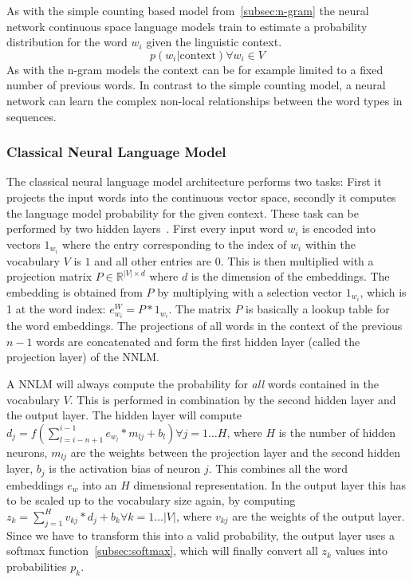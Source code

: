 As with the simple counting based model from~\ref{subsec:n-gram} the neural network continuous space language models train to
estimate a probability distribution for the word $w_i$ given the linguistic context.
\[
    p(w_i|\text{context}) \forall w_i \in V
\]
As with the n-gram models the context can be for example limited to a fixed number of previous words. In contrast to the
simple counting model, a neural network can learn the complex non-local relationships between the word types in sequences.

\subsubsection{Classical Neural Language Model}

The classical neural language model architecture performs two tasks: First it projects the input words into the continuous vector space,
secondly it computes the language model probability for the given context. These task can be performed by two 
hidden layers~\cite{Schwenk:2007:CSL:1230156.1230409}. 
First every input word $w_i$ is encoded into vectors $1_{w_i}$ where
the entry corresponding to the index of $w_i$ within the vocabulary $V$ is $1$ and all other entries are $0$. 
This is then multiplied with a projection matrix $P \in \mathbb{R}^{|V| \times d}$ where $d$ is the dimension of the embeddings.
The embedding is obtained from $P$ by multiplying with a selection vector $1_{w_i}$, 
which is 1 at the word index: $e_{w_i}^W = P * 1_{w_i}$. The matrix $P$ is basically a lookup 
table for the word embeddings. 
The projections of all words in the context of the previous $n-1$ words are concatenated and form 
the first hidden layer (called the projection layer) of the NNLM.

A NNLM will always compute the probability for \textit{all} words contained in the vocabulary $V$. 
This is performed in combination by the second hidden layer and the output layer. 
The hidden layer will compute $d_j = f(\sum_{l = i-n+1}^{i-1} e_{w_l} * m_{lj} + b_l) \forall j = 1 \dots H$, 
where $H$ is the number of hidden neurons, $m_{lj}$ are the weights between the projection layer and the second hidden layer,
$b_j$ is the activation bias of neuron $j$. This combines all the word embeddings $e_w$ into an $H$ dimensional representation.
In the output layer this has to be scaled up to the vocabulary size again, 
by computing $z_k = \sum_{j = 1}^{H} v_{kj} * d_j + b_k \forall k = 1 \dots |V|$, where $v_{kj}$ are the weights of the output layer.
Since we have to transform this into a valid probability, the output layer uses a softmax function~\ref{subsec:softmax}, which
will finally convert all $z_k$ values into probabilities $p_k$.
 
